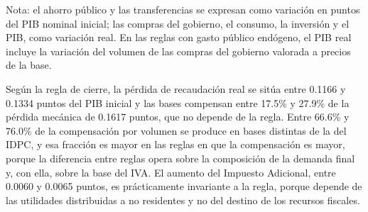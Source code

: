 \documentclass[11pt]{article}
\begin{document}
\begin{table}[H]
\centering
\caption{Disminución del IDPC: financiamiento de la pérdida y ajuste del cierre según la regla}
\label{tab:cierre-idpc-uso}
\small
{}
\par\smallskip
\begin{minipage}{\textwidth}
\footnotesize Nota: el ahorro público y las transferencias se expresan como variación en puntos del PIB nominal inicial; las compras del gobierno, el consumo, la inversión y el PIB, como variación real. En las reglas con gasto público endógeno, el PIB real incluye la variación del volumen de las compras del gobierno valorada a precios de la base.
\end{minipage}
\end{table}

Según la regla de cierre, la pérdida de recaudación real se sitúa entre 0.1166 y 0.1334 puntos del PIB inicial y las bases compensan entre 17.5\% y 27.9\% de la pérdida mecánica de 0.1617 puntos, que no depende de la regla. Entre 66.6\% y 76.0\% de la compensación por volumen se produce en bases distintas de la del IDPC, y esa fracción es mayor en las reglas en que la compensación es mayor, porque la diferencia entre reglas opera sobre la composición de la demanda final y, con ella, sobre la base del IVA. El aumento del Impuesto Adicional, entre 0.0060 y 0.0065 puntos, es prácticamente invariante a la regla, porque depende de las utilidades distribuidas a no residentes y no del destino de los recursos fiscales.
\end{document}

